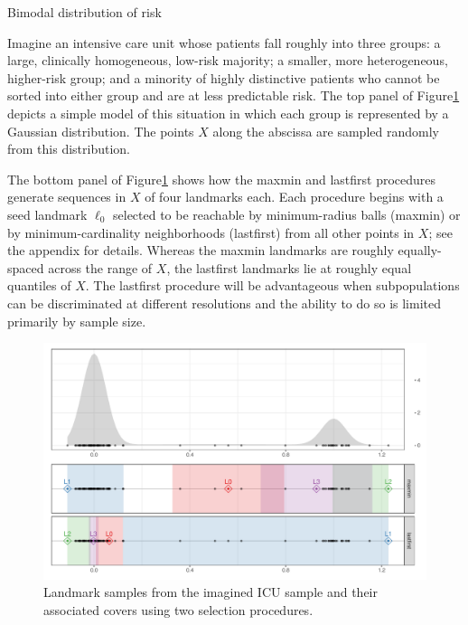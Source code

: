 \documentclass{article}
\begin{document}
\begin{example}{Bimodal distribution of risk}

Imagine an intensive care unit whose patients fall roughly into three groups: a large, clinically homogeneous, low-risk majority; a smaller, more heterogeneous, higher-risk group; and a minority of highly distinctive patients who cannot be sorted into either group and are at less predictable risk.
The top panel of Figure\nbs\ref{fig:icu-cover} depicts a simple model of this situation in which each group is represented by a Gaussian distribution.
The points $X$ along the abscissa are sampled randomly from this distribution.

The bottom panel of Figure\nbs\ref{fig:icu-cover} shows how the maxmin and lastfirst procedures generate sequences in $X$ of four landmarks each.
Each procedure begins with a seed landmark $\ell_0$ selected to be reachable by minimum-radius balls (maxmin) or by minimum-cardinality neighborhoods (lastfirst) from all other points in $X$; see the appendix for details.
Whereas the maxmin landmarks are roughly equally-spaced across the range of $X$, the lastfirst landmarks lie at roughly equal quantiles of $X$.
The lastfirst procedure will be advantageous when subpopulations can be discriminated at different resolutions and the ability to do so is limited primarily by sample size.

\begin{figure}
\includegraphics[width=\textwidth]{../figures/vardens-cover}
\caption{
Landmark samples from the imagined ICU sample and their associated covers using two selection procedures.
\label{fig:icu-cover}
}
\end{figure}

\end{example}
\end{document}
